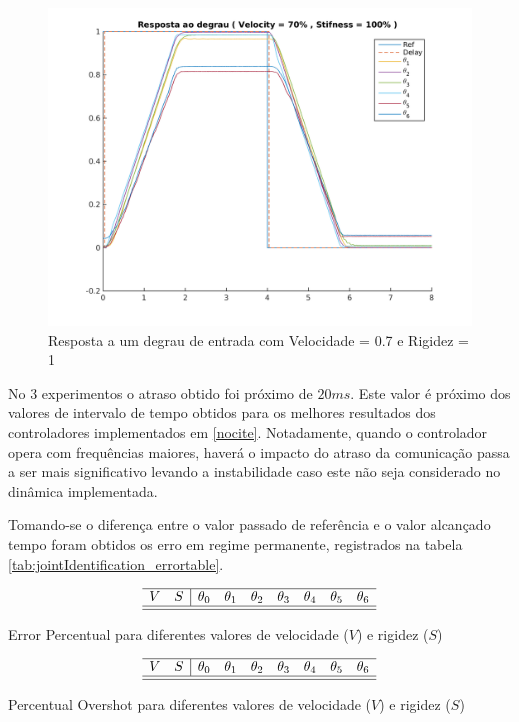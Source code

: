 \begin{figure}[H]
    \centering
    \includegraphics[width=0.6\linewidth]{tex/figs/jointIdentification_exp3v70v100.png}
    \caption{Resposta a um degrau de entrada com Velocidade = 0.7 e Rigidez = 1}
    \label{fig:jointIdentification_exp3v70v100}
\end{figure}

No 3 experimentos o atraso obtido foi próximo de $20ms$. Este valor é próximo dos valores de intervalo de tempo obtidos para os melhores resultados dos controladores implementados em \ref{nocite}. Notadamente, quando o controlador opera com frequências maiores, haverá o impacto do atraso da comunicação passa a ser mais significativo levando a instabilidade caso este não seja considerado no dinâmica implementada.


Tomando-se o diferença entre o valor passado de referência e o valor alcançado tempo foram obtidos os erro em regime permanente, registrados na tabela \ref{tab:jointIdentification_errortable}.

\begin{table}[H]
    \centering
    $$\begin{array}{cc|ccccccc}
         \hline
         V & S & \theta_0 & \theta_1 & \theta_2 & \theta_3 & \theta_4 & \theta_5 & \theta_6\\
         \hline
         
         \hline
    \end{array}$$
    \caption{Error Percentual para diferentes valores de velocidade ($V$) e rigidez ($S$)}
    \label{tab:jointIdentification_errortable}
\end{table}

\begin{table}[H]
    \centering
    $$\begin{array}{cc|ccccccc}
         \hline
         V & S & \theta_0 & \theta_1 & \theta_2 & \theta_3 & \theta_4 & \theta_5 & \theta_6\\
         \hline
         
         \hline
    \end{array}$$
    \caption{Percentual Overshot para diferentes valores de velocidade ($V$) e rigidez ($S$)}
    \label{tab:jointIdentification_overshottable}
\end{table}

